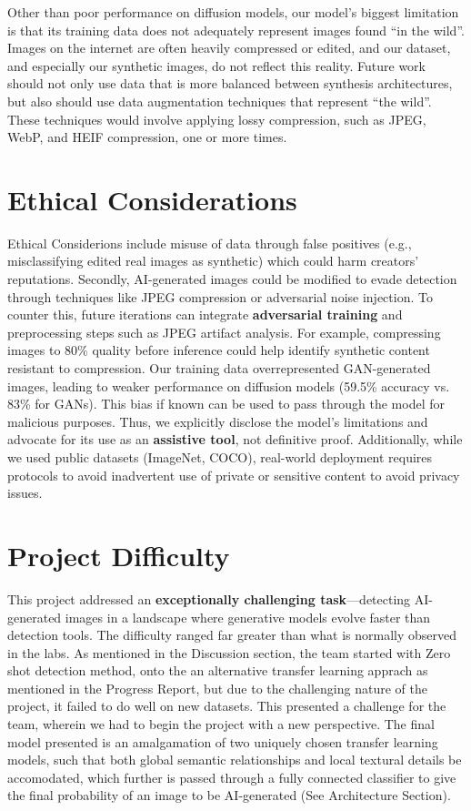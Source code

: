 \documentclass{article} %
\begin{document}
Other than poor performance on diffusion models, our model's biggest limitation is that its training data does not adequately represent images found ``in the wild''. Images on the internet are often heavily compressed or edited, and our dataset, and especially our synthetic images, do not reflect this reality. Future work should not only use data that is more balanced between synthesis architectures, but also should use data augmentation techniques that represent ``the wild''. These techniques would involve applying lossy compression, such as JPEG, WebP, and HEIF compression, one or more times.

\section{Ethical Considerations}

Ethical Considerions include misuse of data through false positives (e.g., misclassifying edited real images as synthetic) which could harm creators' reputations. Secondly, AI-generated images could be modified to evade detection through techniques like JPEG compression or adversarial noise injection. To counter this, future iterations can integrate \textbf{adversarial training} and preprocessing steps such as JPEG artifact analysis. For example, compressing images to 80\% quality before inference could help identify synthetic content resistant to compression.
Our training data overrepresented GAN-generated images, leading to weaker performance on diffusion models (59.5\% accuracy vs. 83\% for GANs). This bias if known can be used to pass through the model for malicious purposes. Thus, we explicitly disclose the model’s limitations and advocate for its use as an \textbf{assistive tool}, not definitive proof. Additionally, while we used public datasets (ImageNet, COCO), real-world deployment requires protocols to avoid inadvertent use of private or sensitive content to avoid privacy issues.


\section{Project Difficulty}

This project addressed an \textbf{exceptionally challenging task}—detecting AI-generated images in a landscape where generative models evolve faster than detection tools. The difficulty ranged far greater than what is normally observed in the labs. As mentioned in the Discussion section, the team started with Zero shot detection method, onto the 
an alternative transfer learning apprach as mentioned in the Progress Report, but due to the challenging nature of the project, it failed to do well on new datasets. This presented a challenge for the team, wherein we had to begin the project with a new perspective. The final model presented is an amalgamation of two uniquely chosen transfer learning models, such that both global semantic relationships and local textural details be accomodated, which further is passed through a fully connected classifier to give the final probability of an image to be AI-generated (See Architecture Section).
\end{document}
